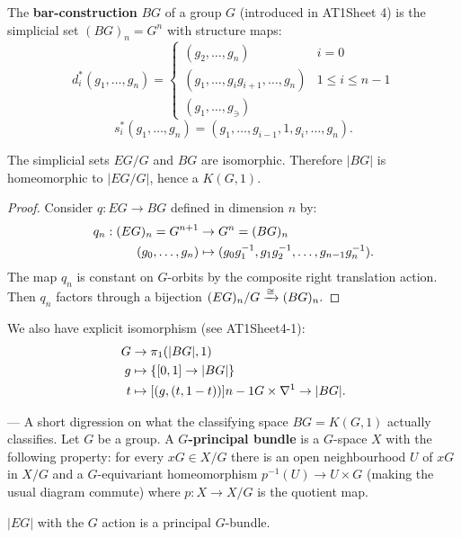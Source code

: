 \begin{remark}
The \textbf{bar-construction} $BG$ of a group $G$ (introduced in AT1Sheet 4) is the simplicial set $(BG)_n=G^n$ with structure maps:
\[d^*_i(g_1,\dots,g_n)=\begin{cases}
(g_2,\dots,g_n) & i=0\\
(g_1,\dots,g_ig_{i+1},\dots,g_n) & 1\leq i\leq n-1\\
(g_1,\dots,g_\ni)
\end{cases}\]
\[s^*_i(g_1,\dots,g_n)=(g_1,\dots,g_{i-1},1,g_{i},\dots,g_n).\]

\begin{lemma}
The simplicial sets $EG/G$ and $BG$ are isomorphic. Therefore $|BG|$ is homeomorphic to $|EG/G|$, hence a $K(G,1)$.
\end{lemma}

\begin{proof}
Consider $q:EG\to BG$ defined in dimension $n$ by:
\begin{align*}
    q_n:(EG)_n=G^{n+1}&\to G^n=(BG)_n\\
    ({{g}_0,\dots,{g}_{n}})&\mapsto(g_0g_1^{-1},g_1g_2^{-1},\dots,g_{n-1} g_n^{-1}).
\end{align*}
The map $q_n$ is constant on $G$-orbits by the composite right translation action. Then $q_n$ factors through a bijection $(EG)_n/G\xrightarrow{\cong}(BG)_n.$
\end{proof}
\end{remark}

We also have explicit isomorphism (see AT1Sheet4-1):
\begin{align*}
    G&\to\pi_1(|BG|,1)\\
    g&\mapsto\cb{[0,1]\to|BG|}\\
    t&\mapsto[(g,(t,1-t))]\cont G\times\sx{1}\to|BG|.
\end{align*}

 --- A short digression on what the classifying space $BG=K(G,1)$ actually classifies. Let $G$ be a group. A \textbf{$G$-principal bundle} is a $G$-space $X$ with the following property: for every $xG\in X/G$ there is an open neighbourhood $U$ of $xG$ in $X/G$ and a $G$-equivariant homeomorphism $p^{-1}(U)\to U\times G$ (making the usual diagram commute) where $p:X\to X/G$ is the quotient map.

\begin{example}
$|EG|$ with the $G$ action is a principal $G$-bundle.
\end{example}

